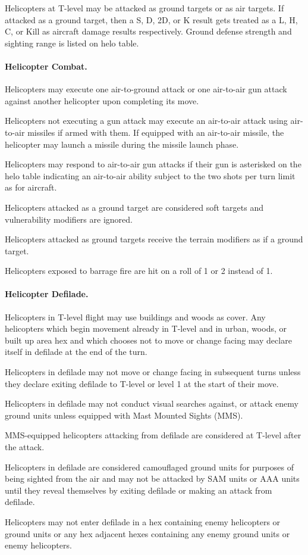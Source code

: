{Helicopters at T-level may be attacked as ground targets or as air targets.  If attacked as a ground target, then a S, D, 2D, or K result gets treated as a L, H, C, or Kill as aircraft damage results respectively.  Ground defense strength and sighting range is listed on helo table.

\paragraph{Helicopter Combat.}

Helicopters may execute one air-to-ground attack or one air-to-air gun attack against another helicopter upon completing its move.

Helicopters not executing a gun attack may execute an air-to-air attack using air-to-air missiles if armed with them.  If equipped with an air-to-air missile, the helicopter may launch a missile during the missile launch phase.

Helicopters may respond to air-to-air gun attacks if their gun is asterisked on the helo table indicating an air-to-air ability subject to the two shots per turn limit as for aircraft.

Helicopters attacked as a ground target are considered soft targets and vulnerability modifiers are ignored.

Helicopters attacked as ground targets receive the terrain modifiers as if a ground target.

Helicopters exposed to barrage fire are hit on a roll of 1 or 2 instead of 1.

\paragraph{Helicopter Defilade.}

Helicopters in T-level flight may use buildings and woods as cover.  Any helicopters which begin movement already in T-level and in urban, woods, or built up area hex and which chooses not to move or change facing may declare itself in defilade at the end of the turn.

Helicopters in defilade may not move or change facing in subsequent turns unless they declare exiting defilade to T-level or level 1 at the start of their move. 

Helicopters in defilade may not conduct visual searches against, or attack enemy ground units unless equipped with Mast Mounted Sights (MMS).

MMS-equipped helicopters attacking from defilade are considered at T-level after the attack.

Helicopters in defilade are considered camouflaged ground units for purposes of being sighted from the air and may not be attacked by SAM units or AAA units until they reveal themselves by exiting defilade or making an attack from defilade.

Helicopters may not enter defilade in a hex containing enemy helicopters or ground units or any hex adjacent hexes containing any enemy ground units or enemy helicopters. 

}